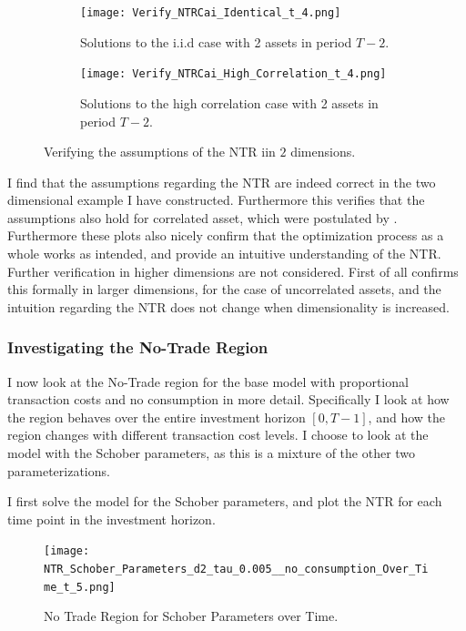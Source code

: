 \documentclass[11pt]{article}
\begin{document}
\begin{figure}[!ht]
    \centering
    \begin{subfigure}[t]{0.48\textwidth}
        \centering
        \texttt{[image: Verify\_NTRCai\_Identical\_t\_4.png]}
        \caption{Solutions to the i.i.d case with 2 assets in period $T-2$.}
        \label{fig:NTR_verify_iid}
    \end{subfigure}%
    \hfill
    \begin{subfigure}[t]{0.48\textwidth}
        \centering
        \texttt{[image: Verify\_NTRCai\_High\_Correlation\_t\_4.png]}
        \caption{Solutions to the high correlation case with 2 assets in period $T-2$.}
        \label{fig:NTR_verify_Correlation}
    \end{subfigure}

    \caption{Verifying the assumptions of the NTR iin $2$ dimensions.}
    \label{fig:NTR_Verify}
\end{figure}
I find that the assumptions regarding the \ac{NTR} are indeed correct in the two dimensional example I have constructed.
Furthermore this verifies that the assumptions also hold for correlated asset, which were postulated by \autocite{liu2002}.
Furthermore these plots also nicely confirm that the optimization process as a whole works as intended, and provide an intuitive understanding of the \ac{NTR}.
Further verification in higher dimensions are not considered. First of all \autocite{liu2002} confirms this formally in larger dimensions,
for the case of uncorrelated assets, and the intuition regarding the \ac{NTR} does not change when dimensionality is increased.

\subsubsection{Investigating the No-Trade Region} \label{Subsubsection: InvestigatingNTR}
I now look at the No-Trade region for the base model with proportional transaction costs and no consumption in more detail.
Specifically I look at how the region behaves over the entire investment horizon $[0, T-1]$, and how the region changes with different transaction cost levels.
I choose to look at the model with the Schober parameters, as this is a mixture of the other two parameterizations.

I first solve the model for the Schober parameters, and plot the \ac{NTR} for each time point in the investment horizon.
\begin{figure}[!ht]
    \centering
    \texttt{[image: NTR\_Schober\_Parameters\_d2\_tau\_0.005\_\_no\_consumption\_Over\_Time\_t\_5.png]}
    \caption{No Trade Region for Schober Parameters over Time.}
    \label{fig:NTR_2d_iid_standalone}
\end{figure}
\end{document}
